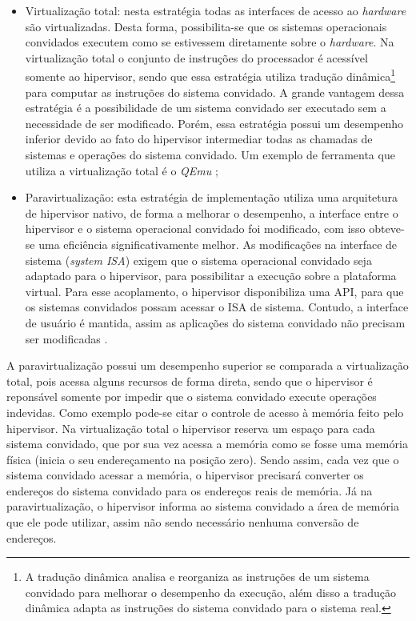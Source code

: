 \begin{itemize}
 \item Virtualização total: nesta estratégia todas as interfaces de acesso ao \textit{hardware} são virtualizadas. Desta forma, possibilita-se 
 que os sistemas operacionais convidados executem como se estivessem diretamente sobre o \textit{hardware}. Na virtualização total o conjunto de 
 instruções do processador é acessível somente ao hipervisor, sendo que essa estratégia utiliza tradução dinâmica\footnote{A tradução dinâmica 
 analisa e reorganiza as instruções de um sistema convidado para melhorar o desempenho da execução, além disso a tradução dinâmica adapta as 
 instruções do sistema convidado para o sistema real.} para computar as instruções do sistema convidado. A grande vantagem dessa estratégia é a 
 possibilidade de um sistema convidado ser executado sem a necessidade de ser modificado. Porém, essa estratégia possui um desempenho inferior 
 devido ao fato do hipervisor intermediar todas as chamadas de sistemas e operações do sistema convidado. Um exemplo de ferramenta que utiliza 
 a virtualização total é o \textit{QEmu} \cite{qemu};
 \item Paravirtualização: esta estratégia de implementação utiliza uma arquitetura de hipervisor nativo, de forma a melhorar o desempenho, 
 a interface entre o hipervisor e o sistema operacional convidado foi modificado, com isso obteve-se uma eficiência significativamente melhor. 
 As modificações na interface de sistema (\textit{system \ac{ISA}}) exigem que o sistema operacional convidado seja adaptado para o hipervisor, 
 para possibilitar a execução sobre a plataforma virtual. Para esse acoplamento, o hipervisor disponibiliza uma \ac{API}, para que os 
 sistemas convidados possam acessar o \ac{ISA} de sistema. Contudo, a interface de usuário é mantida, assim as aplicações do sistema convidado 
 não precisam ser modificadas \cite{maziero2013}.
\end{itemize}

A paravirtualização possui um desempenho superior se comparada a virtualização total, pois acessa alguns recursos de forma direta, sendo que 
o hipervisor é reponsável somente por impedir que o sistema convidado execute operações indevidas. Como exemplo pode-se citar o controle de
acesso à memória feito pelo hipervisor. Na virtualização total o hipervisor reserva um espaço para cada sistema convidado, que por sua vez 
acessa a memória como se fosse uma memória física (inicia o seu endereçamento na posição zero). Sendo assim, cada vez que o sistema convidado 
acessar a memória, o hipervisor precisará converter os endereços do sistema convidado para os endereços reais de memória. Já na paravirtualização, 
o hipervisor informa ao sistema convidado a área de memória que ele pode utilizar, assim não sendo necessário nenhuma conversão de endereços.


